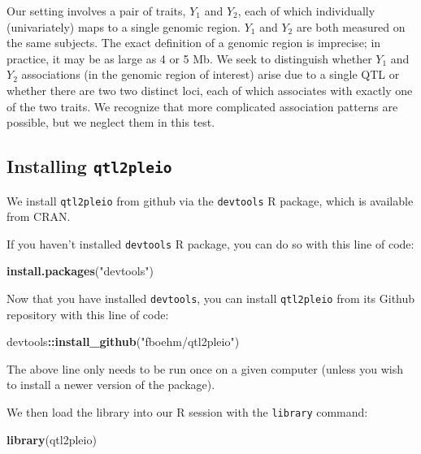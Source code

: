 \documentclass[oneside]{book}
\newenvironment{Shaded}{\begin{snugshade}}{\end{snugshade}}
\newcommand{\KeywordTok}[1]{\textcolor[rgb]{0.13,0.29,0.53}{\textbf{#1}}}
\newcommand{\NormalTok}[1]{#1}
\newcommand{\OperatorTok}[1]{\textcolor[rgb]{0.81,0.36,0.00}{\textbf{#1}}}
\newcommand{\StringTok}[1]{\textcolor[rgb]{0.31,0.60,0.02}{#1}}
\begin{document}
Our setting involves a pair of traits, \(Y_1\) and \(Y_2\), each of
which individually (univariately) maps to a single genomic region.
\(Y_1\) and \(Y_2\) are both measured on the same subjects. The exact
definition of a genomic region is imprecise; in practice, it may be as
large as 4 or 5 Mb. We seek to distinguish whether \(Y_1\) and \(Y_2\)
associations (in the genomic region of interest) arise due to a single
QTL or whether there are two two distinct loci, each of which associates
with exactly one of the two traits. We recognize that more complicated
association patterns are possible, but we neglect them in this test.

\hypertarget{installing-qtl2pleio}{%
\subsection{\texorpdfstring{Installing
\texttt{qtl2pleio}}{Installing qtl2pleio}}\label{installing-qtl2pleio}}

We install \texttt{qtl2pleio} from github via the \texttt{devtools} R
package, which is available from CRAN.

If you haven't installed \texttt{devtools} R package, you can do so with
this line of code:

\begin{Shaded}
\begin{Highlighting}[]
\KeywordTok{install.packages}\NormalTok{(}\StringTok{"devtools"}\NormalTok{)}
\end{Highlighting}
\end{Shaded}

Now that you have installed \texttt{devtools}, you can install
\texttt{qtl2pleio} from its Github repository with this line of code:

\begin{Shaded}
\begin{Highlighting}[]
\NormalTok{devtools}\OperatorTok{::}\KeywordTok{install_github}\NormalTok{(}\StringTok{"fboehm/qtl2pleio"}\NormalTok{)}
\end{Highlighting}
\end{Shaded}

The above line only needs to be run once on a given computer (unless you
wish to install a newer version of the package).

We then load the library into our R session with the \texttt{library}
command:

\begin{Shaded}
\begin{Highlighting}[]
\KeywordTok{library}\NormalTok{(qtl2pleio)}
\end{Highlighting}
\end{Shaded}
\end{document}
